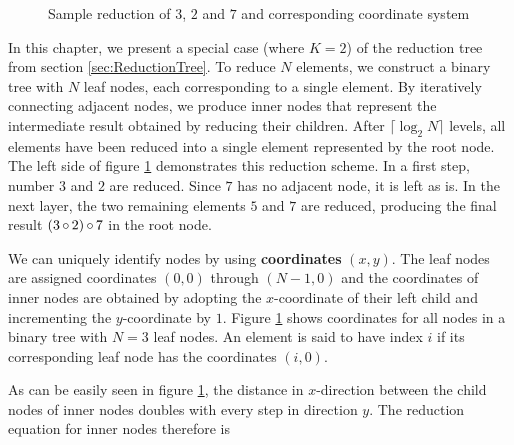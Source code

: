 \newcommand{\numLevels}{\lceil \log_2 N \rceil}
\newcommand{\ffs}{\textrm{ffs}}
\newcommand{\nodesum}{\textrm{sum}\,}

\begin{figure}[H]
\centering
{}
\caption{Sample reduction of $3$, $2$ and $7$ and corresponding coordinate system}
\label{fig:coordinateExample}
\end{figure}

In this chapter, we present a special case (where $K = 2$) of the reduction tree from section \ref{sec:ReductionTree}.
To reduce $N$ elements, we construct a binary tree with $N$ leaf nodes,
each corresponding to a single element.
By iteratively connecting adjacent nodes, we produce inner nodes that represent the intermediate result obtained by reducing their children.
After $\numLevels$ levels, all elements have been reduced into a single element represented by the root node.
The left side of figure \ref{fig:coordinateExample} demonstrates this reduction scheme. In a first step, number $3$ and $2$ are reduced.
Since $7$ has no adjacent node, it is left as is. In the next layer, the two remaining elements $5$ and $7$ are reduced, producing the final
result $(3 \operatorname{\circ} 2) \operatorname{\circ} 7$ in the root node.

We can uniquely identify nodes by using \textbf{coordinates} $(x, y)$. The leaf nodes are assigned coordinates
$(0,0)$ through $(N-1,0)$ and the coordinates of inner nodes are obtained by adopting the $x$-coordinate of their left child and incrementing
the $y$-coordinate by $1$. Figure \ref{fig:coordinateExample} shows coordinates for all nodes in a binary tree with $N = 3$ leaf nodes.
An element is said to have index $i$ if its corresponding leaf node has the coordinates $(i,0)$.

As can be easily seen in figure \ref{fig:coordinateExample}, the distance in $x$-direction between the child nodes of inner nodes doubles
with every step in direction $y$. The reduction equation for inner nodes therefore is


